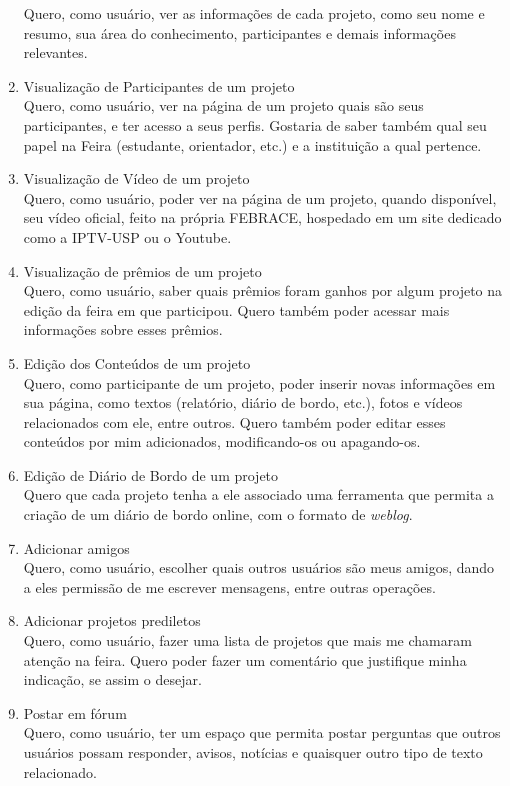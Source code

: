 \begin{enumerate}
      Quero, como usuário, ver as informações de cada projeto, como seu nome e resumo, sua área do conhecimento, participantes e demais informações relevantes.
    \item Visualização de Participantes de um projeto \\
      Quero, como usuário, ver na página de um projeto quais são seus participantes, e ter acesso a seus perfis. Gostaria de saber também qual seu papel na Feira (estudante, orientador, etc.) e a instituição a qual pertence.
    \item Visualização de Vídeo de um projeto \\
      Quero, como usuário, poder ver na página de um projeto, quando disponível, seu vídeo oficial, feito na própria FEBRACE, hospedado em um site dedicado como a IPTV-USP ou o Youtube.
    \item Visualização de prêmios de um projeto \\
      Quero, como usuário, saber quais prêmios foram ganhos por algum projeto na edição da feira em que participou. Quero também poder acessar mais informações sobre esses prêmios.
    \item Edição dos Conteúdos de um projeto \\
      Quero, como participante de um projeto, poder inserir novas informações em sua página, como textos (relatório, diário de bordo, etc.), fotos e vídeos relacionados com ele, entre outros. Quero também poder editar esses conteúdos por mim adicionados, modificando-os ou apagando-os.
    \item Edição de Diário de Bordo de um projeto \\
      Quero que cada projeto tenha a ele associado uma ferramenta que permita a criação de um diário de bordo online, com o formato de \textit{weblog}.
    \item Adicionar amigos \\
      Quero, como usuário, escolher quais outros usuários são meus amigos, dando a eles permissão de me escrever mensagens, entre outras operações.
    \item Adicionar projetos prediletos \\
      Quero, como usuário, fazer uma lista de projetos que mais me chamaram atenção na feira. Quero poder fazer um comentário que justifique minha indicação, se assim o desejar.
    \item Postar em fórum \\
      Quero, como usuário, ter um espaço que permita postar perguntas que outros usuários possam responder, avisos, notícias e quaisquer outro tipo de texto relacionado.

\end{enumerate}
